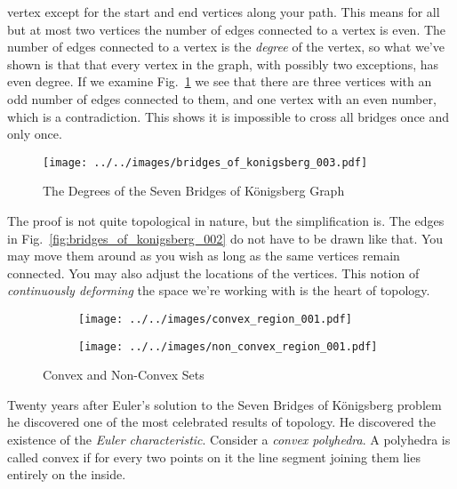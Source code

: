     vertex except for the start and end vertices along your path. This means for
    all but at most two vertices the number of edges connected to a vertex is
    even. The number of edges connected to a vertex is the \textit{degree} of
    the vertex, so what we've shown is that that every vertex in the graph,
    with possibly two exceptions, has even degree. If we examine
    Fig.~\ref{fig:bridges_of_konigsberg_003} we see that there are three
    vertices with an odd number of edges connected to them, and
    one vertex with an even number, which is a contradiction. This shows it is
    impossible to cross all bridges once and only once.
    \begin{figure}[H]
        \centering
        \texttt{[image: ../../images/bridges\_of\_konigsberg\_003.pdf]}
        \caption{The Degrees of the Seven Bridges of K\"{o}nigsberg Graph}
        \label{fig:bridges_of_konigsberg_003}
    \end{figure}
    The proof is not quite topological in nature, but the simplification is.
    The edges in Fig.~\ref{fig:bridges_of_konigsberg_002} do not have to be
    drawn like that. You may move them around as you wish as long as the same
    vertices remain connected. You may also adjust the locations of the
    vertices. This notion of \textit{continuously deforming} the space we're
    working with is the heart of topology.
    \par\hfill\par
    \begin{figure}
        \centering
        \begin{subfigure}[b]{0.49\textwidth}
            \texttt{[image: ../../images/convex\_region\_001.pdf]}
        \end{subfigure}
        \hfill
        \begin{subfigure}[b]{0.49\textwidth}
            \texttt{[image: ../../images/non\_convex\_region\_001.pdf]}
        \end{subfigure}
        \caption{Convex and Non-Convex Sets}
        \label{fig:convex_and_non_convex}
    \end{figure}
    Twenty years after Euler's solution to the Seven Bridges of K\"{o}nigsberg
    problem he discovered one of the most celebrated results of topology. He
    discovered the existence of the \textit{Euler characteristic}. Consider a
    \textit{convex polyhedra}. A polyhedra is called convex if for every
    two points on it the line segment joining them lies entirely on the inside.
